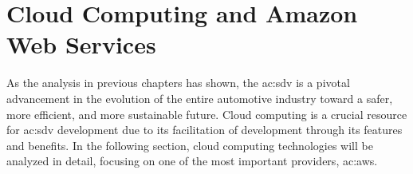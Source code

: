  
\chapter{Cloud Computing and Amazon Web Services} \label{ch:CloudComputingAndAmazonWebServices}

As the analysis in previous chapters has shown, the \gls{ac:sdv} is a pivotal advancement in the evolution of the entire automotive industry toward a safer, more efficient, and more sustainable future. Cloud computing is a crucial resource for \gls{ac:sdv} development due to its facilitation of development through its features and benefits. In the following section, cloud computing technologies will be analyzed in detail, focusing on one of the most important providers, \gls{ac:aws}.
